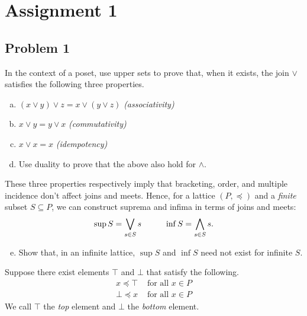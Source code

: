 \documentclass{amsart}
\begin{document}
\section{Assignment 1}

\subsection{Problem 1}

In the context of a poset, use upper sets to prove that, when it exists, the join $\vee$ satisfies the following three properties.

\begin{enumerate}[(a)]
    \item $(x\vee y)\vee z = x\vee (y\vee z)$ \emph{(associativity)}
    \item $x\vee y = y\vee x$ \emph{(commutativity)}
    \item $x\vee x = x$ \emph{(idempotency)}
    \item Use duality to prove that the above also hold for $\wedge$. 
\end{enumerate}

\noindent These three properties respectively imply that bracketing, order, and multiple incidence don't affect joins and meets. Hence, for a lattice $(P,\preceq)$ and a \emph{finite} subset $S\subseteq P$, we can construct suprema and infima in terms of joins and meets:
\[\sup S = \bigvee_{s\in S}s \hspace{10 mm} \inf S = \bigwedge_{s\in S}s.\]
\begin{enumerate}[(a)]\setcounter{enumi}{4}
    \item Show that, in an infinite lattice, $\sup S$ and $\inf S$ need not exist for infinite $S$.
\end{enumerate}

\noindent Suppose there exist elements $\top$ and $\bot$ that satisfy the following.
\begin{align*}
    x\preceq \top &\text{ for all } x\in P \\
    \bot\preceq x &\text{ for all } x\in P
\end{align*}
We call $\top$ the \emph{top} element and $\bot$ the \emph{bottom} element.
\end{document}
